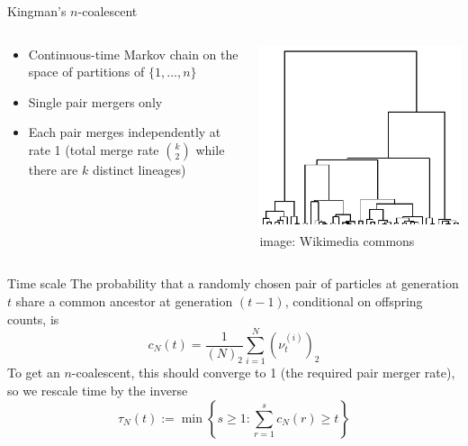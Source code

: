 \documentclass[aspectratio=169]{beamer}
\theoremstyle{definition}
\newcommand{\vt}[2][t]{\nu_{#1}^{(#2)}}
\begin{document}
\begin{frame}{Kingman's $n$-coalescent}
\begin{columns}
\begin{column}{0.45\textwidth}
\begin{itemize}
\item Continuous-time Markov chain on the space of partitions of $\{1,\dots,n\}$
\item Single pair mergers only
\item Each pair merges independently at rate 1 (total merge rate $\binom{k}{2}$ while there are $k$ distinct lineages)
\end{itemize}
\end{column}
\begin{column}{0.45\textwidth}
\includegraphics[width=\textwidth]{kingman.png}
\hspace*{\fill} \tiny{image: Wikimedia commons}
\end{column}
\end{columns}
\end{frame}


\begin{frame}{Time scale}
The probability that a randomly chosen pair of particles at generation $t$ share a common ancestor at generation $(t-1)$, conditional on offspring counts, is
\begin{equation*}
c_N(t) = \frac{1}{(N)_2} \sum_{i=1}^N (\vt{i})_2
\end{equation*}
To get an $n$-coalescent, this should converge to 1 (the required pair merger rate),
so we rescale time by the inverse
\begin{equation*}
\tau_N(t) := \min\left\{ s\geq 1 : \sum_{r=1}^s c_N(r) \geq t \right\}
\end{equation*}
\end{frame}
\end{document}
